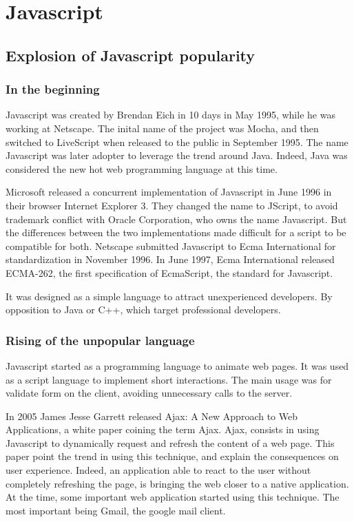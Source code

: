 \section{Javascript}

\subsection{Explosion of Javascript popularity}

\subsubsection{In the beginning}

Javascript was created by Brendan Eich in 10 days in May 1995, while he was working at Netscape.
The inital name of the project was Mocha, and then switched to LiveScript when released to the public in September 1995.
The name Javascript was later adopter to leverage the trend around Java.
Indeed, Java was considered the new hot web programming language at this time.

Microsoft released a concurrent implementation of Javascript in June 1996 in their browser Internet Explorer 3.
They changed the name to JScript, to avoid trademark conflict with Oracle Corporation, who owns the name Javascript.
But the differences between the two implementations made difficult for a script to be compatible for both.
Netscape submitted Javascript to Ecma International for standardization in November 1996.
In June 1997, Ecma International released ECMA-262, the first specification of EcmaScript, the standard for Javascript.

It was designed as a simple language to attract unexperienced developers.
By opposition to Java or C++, which target professional developers.

\subsubsection{Rising of the unpopular language}

Javascript started as a programming language to animate web pages.
It was used as a script language to implement short interactions.
The main usage was for validate form on the client, avoiding unnecessary calls to the server.

In 2005 James Jesse Garrett released Ajax: A New Approach to Web Applications, a white paper coining the term Ajax. \cite{Garrett2005}
Ajax, consists in using Javascript to dynamically request and refresh the content of a web page.
This paper point the trend in using this technique, and explain the consequences on user experience.
Indeed, an application able to react to the user without completely refreshing the page, is bringing the web closer to a native application.
At the time, some important web application started using this technique.
The most important being Gmail, the google mail client.

